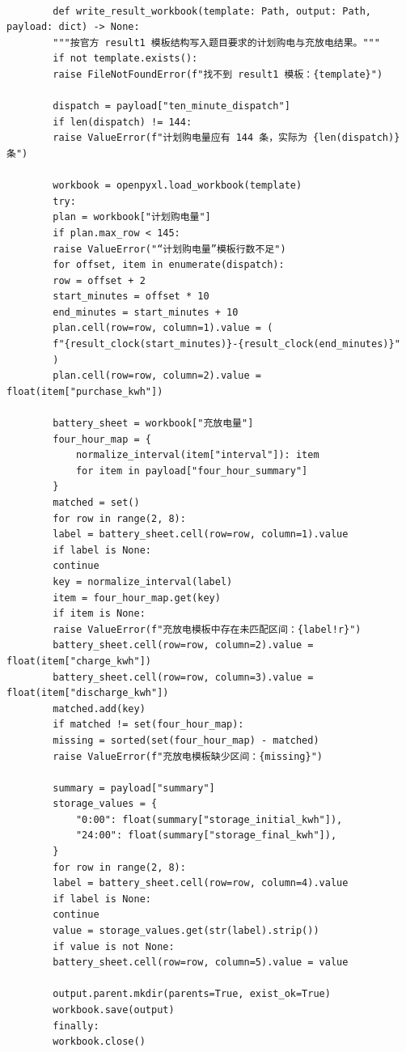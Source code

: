 \documentclass[UTF8]{ctexart}
\begin{document}
\begin{verbatim}
        
        def write_result_workbook(template: Path, output: Path, payload: dict) -> None:
        """按官方 result1 模板结构写入题目要求的计划购电与充放电结果。"""
        if not template.exists():
        raise FileNotFoundError(f"找不到 result1 模板：{template}")
        
        dispatch = payload["ten_minute_dispatch"]
        if len(dispatch) != 144:
        raise ValueError(f"计划购电量应有 144 条，实际为 {len(dispatch)} 条")
        
        workbook = openpyxl.load_workbook(template)
        try:
        plan = workbook["计划购电量"]
        if plan.max_row < 145:
        raise ValueError("“计划购电量”模板行数不足")
        for offset, item in enumerate(dispatch):
        row = offset + 2
        start_minutes = offset * 10
        end_minutes = start_minutes + 10
        plan.cell(row=row, column=1).value = (
        f"{result_clock(start_minutes)}-{result_clock(end_minutes)}"
        )
        plan.cell(row=row, column=2).value = float(item["purchase_kwh"])
        
        battery_sheet = workbook["充放电量"]
        four_hour_map = {
            normalize_interval(item["interval"]): item
            for item in payload["four_hour_summary"]
        }
        matched = set()
        for row in range(2, 8):
        label = battery_sheet.cell(row=row, column=1).value
        if label is None:
        continue
        key = normalize_interval(label)
        item = four_hour_map.get(key)
        if item is None:
        raise ValueError(f"充放电模板中存在未匹配区间：{label!r}")
        battery_sheet.cell(row=row, column=2).value = float(item["charge_kwh"])
        battery_sheet.cell(row=row, column=3).value = float(item["discharge_kwh"])
        matched.add(key)
        if matched != set(four_hour_map):
        missing = sorted(set(four_hour_map) - matched)
        raise ValueError(f"充放电模板缺少区间：{missing}")
        
        summary = payload["summary"]
        storage_values = {
            "0:00": float(summary["storage_initial_kwh"]),
            "24:00": float(summary["storage_final_kwh"]),
        }
        for row in range(2, 8):
        label = battery_sheet.cell(row=row, column=4).value
        if label is None:
        continue
        value = storage_values.get(str(label).strip())
        if value is not None:
        battery_sheet.cell(row=row, column=5).value = value
        
        output.parent.mkdir(parents=True, exist_ok=True)
        workbook.save(output)
        finally:
        workbook.close()
        

\end{verbatim}
\end{document}
